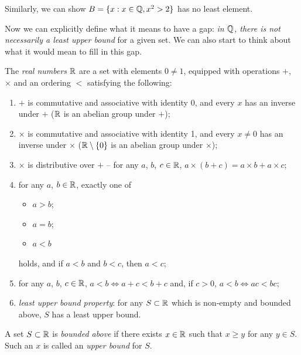 \documentclass{../template/note}
\begin{document}
    \begin{remark*}
        Similarly, we can show \(B = \{x: x \in \mathbb Q, x^2 > 2\}\) has no least element.
    \end{remark*}
    
    Now we can explicitly define what it means to have a gap: \emph{in \(\mathbb Q\), there is not necessarily a least upper bound} for a given set. We can also start to think about what it would mean to fill in this gap.
    
    \begin{definition}
        The \emph{real numbers} \(\mathbb R\) are a set with elements \(0 \neq 1\), equipped with operations \(+\), \(\times\) and an ordering \(<\) satisfying the following:
        \begin{enumerate}[label=\protect\circled{\arabic*}]
            \item \(+\) is commutative and associative with identity 0, and every \(x\) has an inverse under \(+\) (\(\mathbb R\) is an abelian group under \(+\));
            \item \(\times\) is commutative and associative with identity 1, and every \(x \neq 0\) has an inverse under \(\times\) (\(\mathbb R \setminus \{0\}\) is an abelian group under \(\times\));
            \item \(\times\) is distributive over \(+\) -- for any \(a\), \(b\), \(c \in \mathbb R\), \(a \times (b + c) = a \times b + a \times c\);
            \item for any \(a\), \(b \in \mathbb R\), exactly one of
            \begin{itemize}
                \item \(a > b\);
                \item \(a = b\);
                \item \(a < b\)
            \end{itemize}
            holds, and if \(a < b\) and \(b < c\), then \(a < c\);
            \item for any \(a\), \(b\), \(c \in \mathbb R\), \(a < b \iff a + c < b + c\) and, if \(c > 0\), \(a < b \iff ac < bc\);
            \item \emph{least upper bound property}: for any \(S \subset \mathbb R\) which is non-empty and bounded above, \(S\) has a least upper bound.
        \end{enumerate}
    \end{definition}
    
    \begin{definition}
        A set \(S \subset \mathbb R\) is \emph{bounded above} if there exists \(x \in \mathbb R\) such that \(x \geq y\) for any \(y \in S\). Such an \(x\) is called an \emph{upper bound} for \(S\).
    \end{definition}
    
\end{document}
